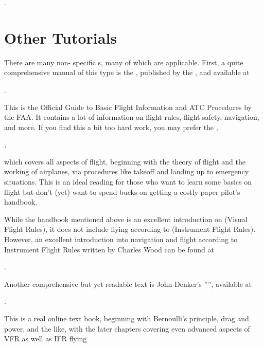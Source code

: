 \medskip
{}.
\medskip

\section{Other Tutorials}

There are many non-\FlightGear{} specific s, many of which are 
applicable. First, a quite comprehensive manual of this type is the 
, published by the , 
and available at

\medskip
{}.
\medskip
\noindent

This is the Official Guide to Basic Flight Information and ATC Procedures by 
the FAA. It contains a lot of information on flight rules, flight safety, 
navigation, and more. If you find this a bit too hard work, you may prefer 
the ,

\medskip
{},
\medskip
\noindent

which covers all aspects of flight, beginning with the theory of flight and the
working of airplanes, via procedures like takeoff and landing up to emergency 
situations. This is an ideal reading for those who want to learn some basics on 
flight but don't (yet) want to spend bucks on getting a costly paper pilot's 
handbook.

While the handbook mentioned above is an excellent introduction on  
(Visual Flight Rules), it does not include flying according to  
(Instrument Flight Rules). However, an excellent introduction into navigation 
and flight according to Instrument Flight Rules written by Charles Wood
 can be found at

.

Another comprehensive but yet readable text is John Denker's
'''', available at
\medskip

.
\medskip

 \noindent
This is a real online text book, beginning with Bernoulli's principle, drag and
power, and the like, with the later chapters covering even advanced aspects of 
VFR as well as IFR flying

